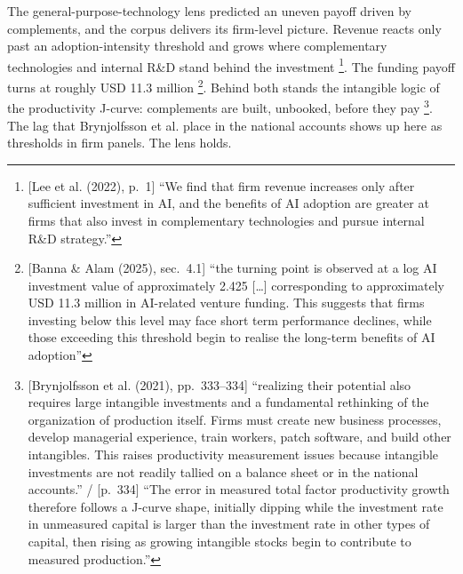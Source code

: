 The general-purpose-technology lens predicted an uneven payoff driven by complements,
and the corpus delivers its firm-level picture. Revenue reacts only past an
adoption-intensity threshold and grows where complementary technologies and internal
R\&D stand behind the investment \parencite[p.~1]{lee2022adoption}\footnote{[Lee et al.
(2022), p.~1] ``We find that firm revenue increases only after sufficient investment in
AI, and the benefits of AI adoption are greater at firms that also invest in
complementary technologies and pursue internal R\&D strategy.''}. The funding payoff
turns at roughly USD 11.3 million \parencite[sec.~4.1]{banna2025value}\footnote{[Banna
\& Alam (2025), sec.~4.1] ``the turning point is observed at a log AI investment value
of approximately 2.425 [\dots] corresponding to approximately USD 11.3 million in
AI-related venture funding. This suggests that firms investing below this level may
face short term performance declines, while those exceeding this threshold begin to
realise the long-term benefits of AI adoption''}. Behind both stands the intangible
logic of the productivity J-curve: complements are built, unbooked, before they
pay \parencite[pp.~333--334]{brynjolfsson2021productivity}\footnote{[Brynjolfsson et
al. (2021), pp.~333--334] ``realizing their potential also requires large intangible
investments and a fundamental rethinking of the organization of production itself.
Firms must create new business processes, develop managerial experience, train workers,
patch software, and build other intangibles. This raises productivity measurement
issues because intangible investments are not readily tallied on a balance sheet or in
the national accounts.'' / [p.~334] ``The error in measured total factor productivity
growth therefore follows a J-curve shape, initially dipping while the investment rate
in unmeasured capital is larger than the investment rate in other types of capital,
then rising as growing intangible stocks begin to contribute to measured
production.''}. The lag that Brynjolfsson et al. place
in the national accounts shows up here as thresholds in firm panels. The lens holds.

